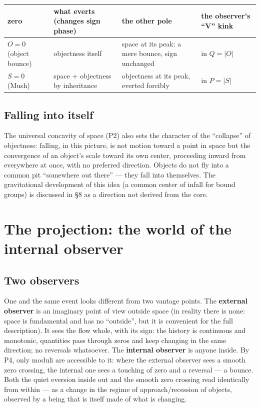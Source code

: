 \documentclass{article}
\begin{document}
\begin{table}[htbp]
\centering
\small
\begin{tabular}{@{}p{1.8cm}p{2.6cm}p{2.6cm}p{1.6cm}@{}}
\toprule
\textbf{zero} & \textbf{what everts (changes sign phase)} & \textbf{the other pole} & \textbf{the observer's ``V'' kink} \\
\midrule
$O = 0$ (object bounce) & objectness itself & space at its peak: a mere bounce, sign unchanged & in $Q = |O|$ \\
\addlinespace
$S = 0$ (Mush) & space + objectness by inheritance & objectness at its peak, everted forcibly & in $P = |S|$ \\
\bottomrule
\end{tabular}
\end{table}

\subsection{Falling into itself}

The universal concavity of space (P2) also sets the character of the ``collapse'' of objectness: falling, in this picture, is not motion toward a point in space but the convergence of an object's scale toward its own center, proceeding inward from everywhere at once, with no preferred direction. Objects do not fly into a common pit ``somewhere out there'' --- they fall into themselves. The gravitational development of this idea (a common center of infall for bound groups) is discussed in \S8 as a direction not derived from the core.
\section{The projection: the world of the internal observer}

\subsection{Two observers}

One and the same event looks different from two vantage points. The \textbf{external observer} is an imaginary point of view outside space (in reality there is none: space is fundamental and has no ``outside'', but it is convenient for the full description). It sees the flow whole, with its sign: the history is continuous and monotonic, quantities pass through zeros and keep changing in the same direction; no reversals whatsoever. The \textbf{internal observer} is anyone inside. By P4, only moduli are accessible to it: where the external observer sees a smooth zero crossing, the internal one sees a touching of zero and a reversal --- a bounce. Both the quiet eversion inside out and the smooth zero crossing read identically from within --- as a change in the regime of approach/recession of objects, observed by a being that is itself made of what is changing.
\end{document}
